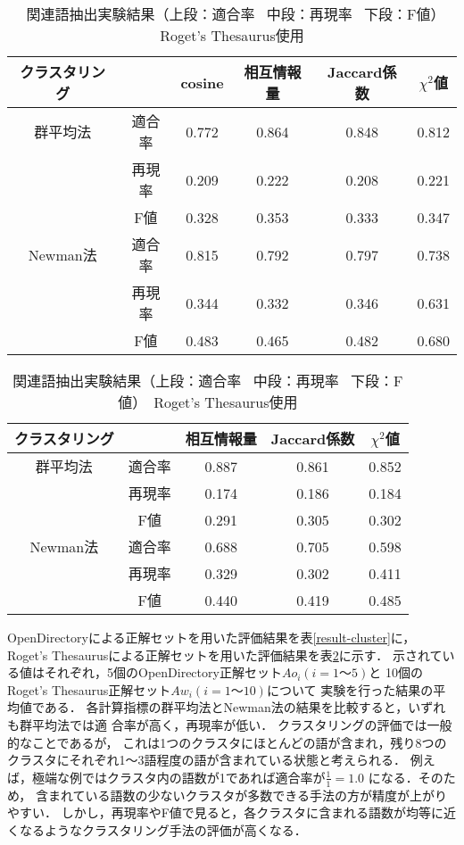 \documentclass[japanese]{jnlp_1.3a}
\begin{document}
\begin{table}[b]
	\begin{center}
	 \caption{関連語抽出実験結果（上段：適合率 \ 中段：再現率
	\  下段：F値）　OpenDirectory使用}
	\label{result-cluster}
	 \begin{tabular}{c|c|cccc}
	  クラスタリング &  & cosine  & 相互情報量 & Jaccard係数 & $\chi^2$値 \\ \hline
	  群平均法 & 適合率  & 0.772 & 0.864 & 0.848 & 0.812 \\ 
	           & 再現率  & 0.209 & 0.222 & 0.208 & 0.221 \\     
	           & F値     & 0.328 & 0.353 & 0.333 & 0.347 \\ \hline
	  Newman法 & 適合率  & 0.815 & 0.792 & 0.797 & 0.738 \\ 
	           & 再現率  & 0.344 & 0.332 & 0.346 & 0.631 \\ 
	            & F値    & 0.483 & 0.465 & 0.482 & 0.680 \\ \hline
	 \end{tabular}
    \vspace{\baselineskip}

	 \caption{関連語抽出実験結果（上段：適合率 \ 中段：再現率
	\  下段：F値）　Roget's Thesaurus使用}
	\label{result-cluster-wordnet}
	 \begin{tabular}{c|c|ccc}
	  クラスタリング &  & 相互情報量 & Jaccard係数 & $\chi^2$値 \\ \hline 
	  群平均法 
	  & 適合率 & 0.887 & 0.861 & 0.852 \\ 
	  & 再現率 & 0.174 & 0.186 & 0.184 \\ 
	  & F値    & 0.291 & 0.305 & 0.302 \\ \hline
	  Newman法 
	  & 適合率 & 0.688 & 0.705 & 0.598 \\ 
	  & 再現率 & 0.329 & 0.302 & 0.411 \\ 
	  & F値    & 0.440 & 0.419 & 0.485 \\ \hline
	 \end{tabular}
	\end{center}
\end{table}

OpenDirectoryによる正解セットを用いた評価結果を表\ref{result-cluster}に，
Roget's Thesaurusによる正解セットを用いた評価結果を表\ref{result-cluster-wordnet}に示す．
示されている値はそれぞれ，5個のOpenDirectory正解セット$Ao_i(i=1〜5)$と
10個のRoget's Thesaurus正解セット$Aw_i(i=1〜10)$について
実験を行った結果の平均値である．
各計算指標の群平均法とNewman法の結果を比較すると，いずれも群平均法では適
合率が高く，再現率が低い．
クラスタリングの評価では一般的なことであるが，
これは1つのクラスタにほとんどの語が含まれ，残り8つのクラスタにそれぞれ1〜3語程度の語が含まれている状態と考えられる．
例えば，極端な例ではクラスタ内の語数が1であれば適合率が$\frac{1}{1}=1.0$
になる．そのため，
含まれている語数の少ないクラスタが多数できる手法の方が精度が上がりやすい．
しかし，再現率やF値で見ると，各クラスタに含まれる語数が均等に近くなるようなクラスタリング手法の評価が高くなる．
\end{document}
